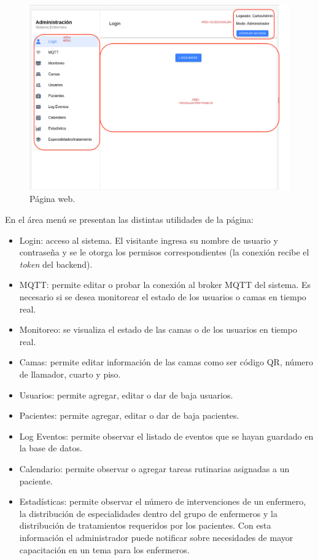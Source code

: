 \begin{figure}[ht]
	\centering
	\includegraphics[scale=.40]{./Figures/pagina-web.png}
	\caption{Página web.}
	\label{fig:Página web}
\end{figure}

En el área menú se presentan las distintas utilidades de la página:
\begin{itemize}
\item Login: acceso al sistema. El visitante ingresa su nombre de usuario y contraseña y se le otorga los permisos correspondientes (la conexión recibe el \textit{token} del backend).
\item MQTT: permite editar o probar la conexión al broker MQTT del sistema. Es necesario si se desea monitorear el estado de los usuarios o camas en tiempo real.
\item Monitoreo: se visualiza el estado de las camas o de los usuarios en tiempo real.
\item Camas: permite editar información de las camas como ser código QR, número de llamador, cuarto y piso.
\item Usuarios: permite agregar, editar o dar de baja usuarios.
\item Pacientes: permite agregar, editar o dar de baja pacientes.
\item Log Eventos: permite observar el listado de eventos que se hayan guardado en la base de datos.
\item Calendario: permite observar o agregar tareas rutinarias asignadas a un paciente.
\item Estadísticas: permite observar el número de intervenciones de un enfermero, la distribución de especialidades dentro del grupo de enfermeros y la distribución de tratamientos requeridos por los pacientes. Con esta información el administrador puede notificar sobre necesidades de mayor capacitación en un tema para los enfermeros.
\end{itemize}


